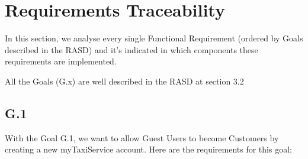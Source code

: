 \documentclass[../../dd.tex]{subfiles}
\begin{document}
	\chapter{Requirements Traceability}
		In this section, we analyse every single Functional Requirement (ordered by Goals described in the RASD) and it's indicated in which components these requirements are implemented.

		All the Goals (G.x) are well described in the RASD at section 3.2

		\section{G.1}
			With the Goal G.1, we want to allow Guest Users to become Customers by creating a new myTaxiService account.
			Here are the requirements for this goal:
			
\end{document}
